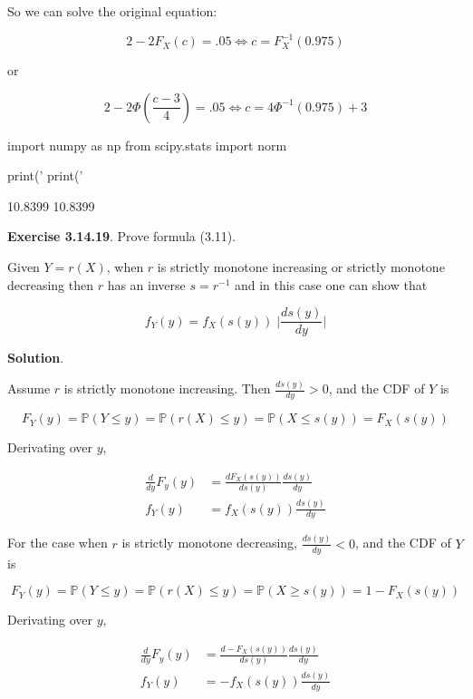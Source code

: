 So we can solve the original equation:

\[ 2 - 2 F_X(c) = .05 \Longleftrightarrow c = F_X^{-1}(0.975) \]

or

\[ 2 - 2 \Phi\left( \frac{c - 3}{4} \right) = .05 \Longleftrightarrow c = 4 \Phi^{-1}(0.975) + 3 \]

\begin{python}
import numpy as np
from scipy.stats import norm

print('%
print('%
\end{python}

\begin{console}
10.8399
10.8399
\end{console}

\textbf{Exercise 3.14.19}. Prove formula (3.11).

Given \(Y = r(X)\), when \(r\) is strictly monotone increasing or
strictly monotone decreasing then \(r\) has an inverse \(s = r^{-1}\)
and in this case one can show that

\[ f_Y(y) = f_X(s(y)) \;\Bigg| \frac{ds(y)}{dy} \Bigg|\]

\textbf{Solution}.

Assume \(r\) is strictly monotone increasing. Then $ \frac{d s(y)}{dy}
> 0$, and the CDF of \(Y\) is

\[ F_Y(y) = \mathbb{P}(Y \leq y) = \mathbb{P}(r(X) \leq y) = \mathbb{P}(X \leq s(y)) = F_X(s(y)) \]

Derivating over \(y\),

\begin{align*}
\frac{d}{dy} F_y(y) &= \frac{d F_X(s(y))}{d s(y)} \frac{d s(y)}{dy} \\
f_Y(y) &= f_X(s(y)) \frac{d s(y)}{dy}
\end{align*}

For the case when \(r\) is strictly monotone decreasing, $
\frac{d s(y)}{dy} < 0$, and the CDF of \(Y\) is

\[ F_Y(y) = \mathbb{P}(Y \leq y) = \mathbb{P}(r(X) \leq y) = \mathbb{P}(X \geq s(y)) = 1 - F_X(s(y)) \]

Derivating over \(y\),

\begin{align*}
\frac{d}{dy} F_y(y) &= \frac{d -F_X(s(y))}{d s(y)} \frac{d s(y)}{dy} \\
f_Y(y) &= -f_X(s(y)) \frac{d s(y)}{dy}
\end{align*}

